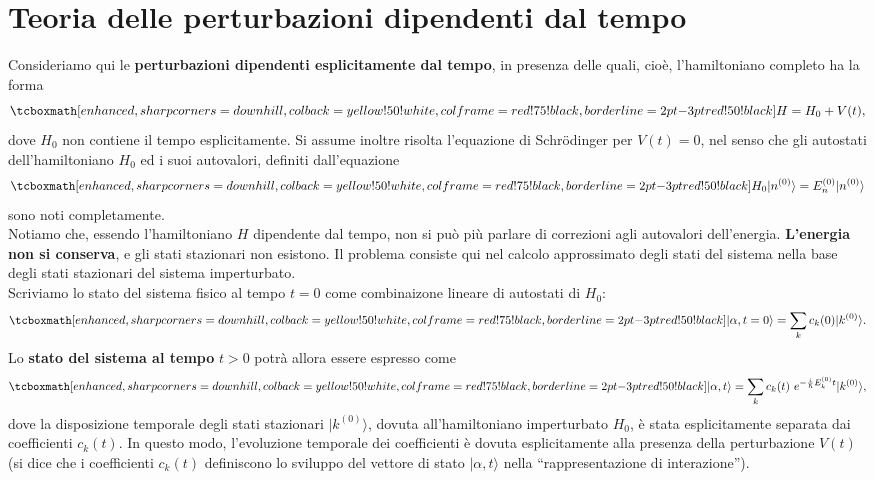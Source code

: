 \pagestyle{VS}
\chapter[T.d.P. dipendenti dal tempo]{Teoria delle perturbazioni dipendenti dal tempo}
Consideriamo qui le \textbf{perturbazioni dipendenti esplicitamente dal tempo}, in presenza delle quali, cioè, l'hamiltoniano completo ha la forma
	\begin{equation}
		\tcboxmath[enhanced, sharp corners=downhill, colback=yellow!50!white, colframe=red!75!black, borderline={2pt}{-3pt}{red!50!black}]{					H=H_0+V(t),
		}
	\end{equation}
dove $H_0$ non contiene il tempo esplicitamente. Si assume inoltre risolta l'equazione di Schr\"{o}dinger per $V(t)=0$, nel senso che gli autostati dell'hamiltoniano $H_0$ ed i suoi autovalori, definiti dall'equazione
	\begin{equation}
		\tcboxmath[enhanced, sharp corners=downhill, colback=yellow!50!white, colframe=red!75!black, borderline={2pt}{-3pt}{red!50!black}]{
			H_0 \vert n ^{(0)} \rangle = E_n ^{(0)} \vert n ^{(0)} \rangle 
			}
	\end{equation}
sono noti completamente.\\

Notiamo che, essendo l'hamiltoniano $H$ dipendente dal tempo, non si può più parlare di correzioni agli autovalori dell'energia. \textbf{L'energia non si conserva}, e gli stati stazionari non esistono. Il problema consiste qui nel calcolo approssimato degli stati del sistema nella base degli stati stazionari del sistema imperturbato.\\

Scriviamo lo stato del sistema fisico al tempo $t=0$ come combinaizone lineare di autostati di $H_0$:
	\begin{equation}
		\tcboxmath[enhanced, sharp corners=downhill, colback=yellow!50!white, colframe=red!75!black, borderline={2pt}{-3pt}{red!50!black}]{
			\vert \alpha ,t=0  \rangle = \sum _k c_k (0) \vert k ^{(0)} \rangle .
			}
	\label{eq:cap15_1}
	\end{equation}
Lo \textbf{stato del sistema al tempo} $t>0$ potrà allora essere espresso come
	\begin{equation}
		\tcboxmath[enhanced, sharp corners=downhill, colback=yellow!50!white, colframe=red!75!black, borderline={2pt}{-3pt}{red!50!black}]{
			\vert \alpha ,t  \rangle = \sum _k c_k (t)\ e^{-\frac{i}{\hbar}E_k ^{(0)} t } \vert k ^{(0)} \rangle ,
			}
	\label{eq:cap15_2}
	\end{equation}
dove la disposizione temporale degli stati stazionari $\vert k ^{(0)} \rangle$, dovuta all'hamiltoniano imperturbato $H_0$, è stata esplicitamente separata dai coefficienti $c_k {(t)}$. In questo modo, l'evoluzione temporale dei coefficienti è dovuta esplicitamente alla presenza della perturbazione $V(t)$  (si dice che i coefficienti $c_k (t)$ definiscono lo sviluppo del vettore di stato $\vert \alpha , t \rangle $ nella ``rappresentazione di interazione'').\\

